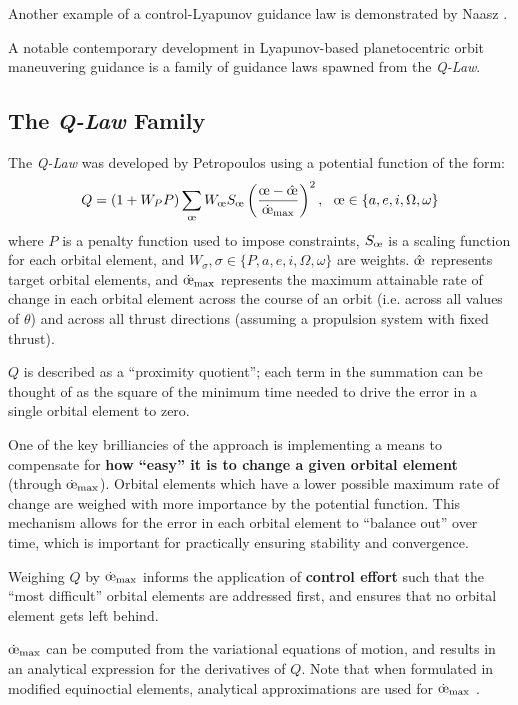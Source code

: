 Another example of a control-Lyapunov guidance law is demonstrated by Naasz \cite{naasz2002classical}.

A notable contemporary development in Lyapunov-based planetocentric orbit maneuvering guidance is a family of guidance laws spawned from the \textit{Q-Law}.

\subsection{The \textit{Q-Law} Family}
The \textit{Q-Law} was developed by Petropoulos \cite{petropoulos2004low} using a potential function of the form:
\begin{equation}
  Q = (1 + W_P P) \sum_{\moe} W_\moe S_\moe \left(\frac{\moe - \hat{\moe}}{\dot{\moe}_{\max}} \right)^2, \ \  \moe \in \{a, e, i, \Omega, \omega\}
  \label{eq:q_law_petropulos}
\end{equation}
where \(P\) is a penalty function used to impose constraints, \(S_\moe\) is a scaling function for each orbital element, and \(W_\sigma, \sigma \in \{P, a, e, i, \Omega, \omega\}\) are weights. \(\hat{\moe}\) represents target orbital elements, and \(\dot{\moe}_{\max}\) represents the maximum attainable rate of change in each orbital element across the course of an orbit (i.e. across all values of \(\theta\)) and across all thrust directions (assuming a propulsion system with fixed thrust).

\(Q\) is described as a ``proximity quotient''; each term in the summation can be thought of as the square of the minimum time needed to drive the error in a single orbital element to zero.

One of the key brilliancies of the approach is implementing a means to compensate for \textbf{how ``easy'' it is to change a given orbital element} (through \(\dot{\moe}_{\max}\)). Orbital elements which have a lower possible maximum rate of change are weighed with more importance by the potential function. This mechanism allows for the error in each orbital element to ``balance out'' over time, which is important for practically ensuring stability and convergence.

Weighing \(Q\) by \(\dot{\moe}_{\max}\) informs the application of \textbf{control effort} such that the ``most difficult'' orbital elements are addressed first, and ensures that no orbital element gets left behind.

\(\dot{\moe}_{\max}\) can be computed from the variational equations of motion, and results in an analytical expression for the derivatives of \(Q\). Note that when formulated in modified equinoctial elements, analytical approximations are used for \(\dot{\moe}_{\max}\) \cite{vargaperez2016, sanjeev2023}.

